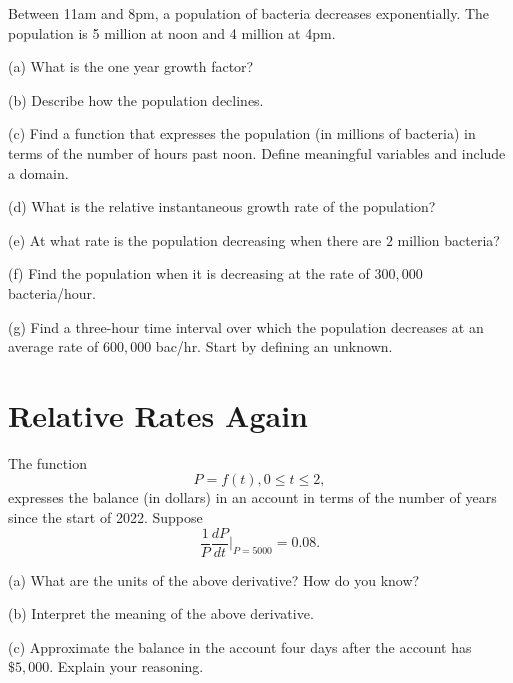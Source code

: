 \documentclass{ximera}
\begin{document}
\begin{question}  \label{Q234gt44}
Between 11am and 8pm, a population of bacteria decreases exponentially. The population is 5 million at noon and 4 million at 4pm.

(a) What is the one year growth factor?

(b) Describe how the population declines.

(c) Find a function that expresses the population (in millions of bacteria) in terms of the number of hours past noon. Define meaningful variables and include a domain.

(d) What is the relative instantaneous growth rate of the population?

(e) At what rate is the population decreasing when there are $2$ million bacteria?

(f) Find the population when it is decreasing at the rate of $300,000$ bacteria/hour.

(g) Find a three-hour time interval over which the population decreases at an average rate of $600,000$ bac/hr. Start by defining an unknown.

\end{question}


\section*{Relative Rates Again}

\begin{question}   \label{Q45fggfbhyhy}
The function
\[
     P = f(t) , 0\leq t \leq 2,
\]
expresses the balance (in dollars) in an account in terms of the number of years since the start of 2022. Suppose 
\[
      \frac{1}{P} \frac{dP}{dt} \Big|_{P=5000} = 0.08 .
\]

(a) What are the units of the above derivative? How do you know?

(b) Interpret the meaning of the above derivative.

(c) Approximate the balance in the account four days after the account has $\$5,000$. Explain your reasoning.

\end{question}
\end{document}
